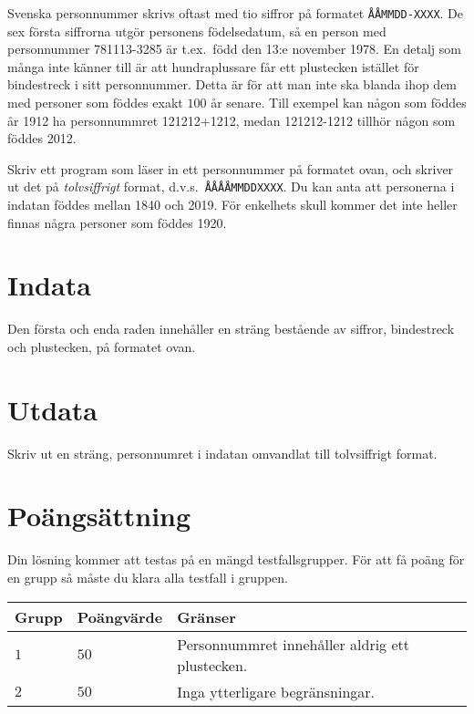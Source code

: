 
Svenska personnummer skrivs oftast med tio siffror på formatet \texttt{ÅÅMMDD-XXXX}. De sex första siffrorna utgör personens födelsedatum, så en
person med personnummer 781113-3285 är t.ex.\ född den 13:e november 1978. En detalj som många
inte känner till är att hundraplussare får ett plustecken istället för bindestreck i sitt 
personnummer. Detta är för att man inte ska blanda ihop dem med personer som föddes exakt $100$
år senare. Till exempel kan någon som föddes år 1912 ha personnummret 121212+1212, medan 
121212-1212 tillhör någon som föddes 2012. 

Skriv ett program som läser in ett personnummer på formatet ovan,
och skriver ut det på \emph{tolvsiffrigt} format, d.v.s.\ \texttt{ÅÅÅÅMMDDXXXX}.
Du kan anta att personerna i indatan föddes mellan 1840 och 2019.
För enkelhets skull kommer det inte heller finnas några personer som föddes 1920. 

\section*{Indata}
Den första och enda raden innehåller en sträng bestående av siffror, bindestreck och plustecken, på formatet ovan.

\section*{Utdata}
Skriv ut en sträng, personnumret i indatan omvandlat till tolvsiffrigt format.

\section*{Poängsättning}
Din lösning kommer att testas på en mängd testfallsgrupper.
För att få poäng för en grupp så måste du klara alla testfall i gruppen.

\noindent
\begin{tabular}{| l | l | l |}
  \hline
  Grupp & Poängvärde & Gränser \\ \hline
  $1$   & $50$       & Personnummret innehåller aldrig ett plustecken. \\ \hline
  $2$   & $50$       & Inga ytterligare begränsningar. \\ \hline
\end{tabular}
